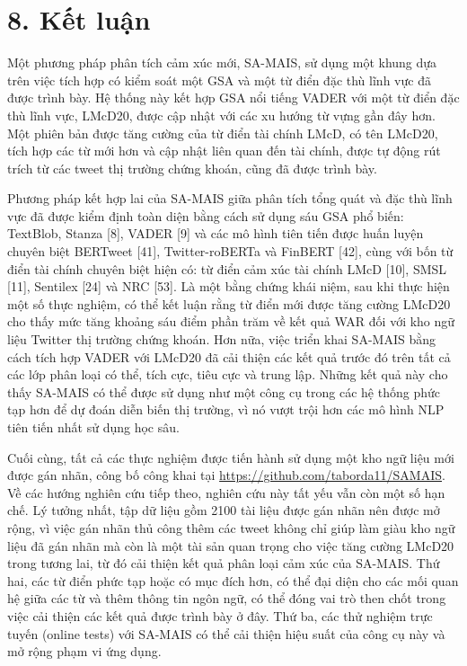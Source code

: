 \section{8. Kết luận}

Một phương pháp phân tích cảm xúc mới, SA-MAIS, sử dụng một khung dựa trên việc tích hợp có kiểm soát một GSA và một từ điển đặc thù lĩnh vực đã được trình bày. Hệ thống này kết hợp GSA nổi tiếng VADER với một từ điển đặc thù lĩnh vực, LMcD20, được cập nhật với các xu hướng từ vựng gần đây hơn. Một phiên bản được tăng cường của từ điển tài chính LMcD, có tên LMcD20, tích hợp các từ mới hơn và cập nhật liên quan đến tài chính, được tự động rút trích từ các tweet thị trường chứng khoán, cũng đã được trình bày.

Phương pháp kết hợp lai của SA-MAIS giữa phân tích tổng quát và đặc thù lĩnh vực đã được kiểm định toàn diện bằng cách sử dụng sáu GSA phổ biến: TextBlob, Stanza [8], VADER [9] và các mô hình tiên tiến được huấn luyện chuyên biệt BERTweet [41], Twitter-roBERTa và FinBERT [42], cùng với bốn từ điển tài chính chuyên biệt hiện có: từ điển cảm xúc tài chính LMcD [10], SMSL [11], Sentilex [24] và NRC [53]. Là một bằng chứng khái niệm, sau khi thực hiện một số thực nghiệm, có thể kết luận rằng từ điển mới được tăng cường LMcD20 cho thấy mức tăng khoảng sáu điểm phần trăm về kết quả WAR đối với kho ngữ liệu Twitter thị trường chứng khoán. Hơn nữa, việc triển khai SA-MAIS bằng cách tích hợp VADER với LMcD20 đã cải thiện các kết quả trước đó trên tất cả các lớp phân loại có thể, tích cực, tiêu cực và trung lập. Những kết quả này cho thấy SA-MAIS có thể được sử dụng như một công cụ trong các hệ thống phức tạp hơn để dự đoán diễn biến thị trường, vì nó vượt trội hơn các mô hình NLP tiên tiến nhất sử dụng học sâu.

Cuối cùng, tất cả các thực nghiệm được tiến hành sử dụng một kho ngữ liệu mới được gán nhãn, công bố công khai tại \url{https://github.com/taborda11/SAMAIS}. Về các hướng nghiên cứu tiếp theo, nghiên cứu này tất yếu vẫn còn một số hạn chế. Lý tưởng nhất, tập dữ liệu gồm 2100 tài liệu được gán nhãn nên được mở rộng, vì việc gán nhãn thủ công thêm các tweet không chỉ giúp làm giàu kho ngữ liệu đã gán nhãn mà còn là một tài sản quan trọng cho việc tăng cường LMcD20 trong tương lai, từ đó cải thiện kết quả phân loại cảm xúc của SA-MAIS. Thứ hai, các từ điển phức tạp hoặc có mục đích hơn, có thể đại diện cho các mối quan hệ giữa các từ và thêm thông tin ngôn ngữ, có thể đóng vai trò then chốt trong việc cải thiện các kết quả được trình bày ở đây. Thứ ba, các thử nghiệm trực tuyến (online tests) với SA-MAIS có thể cải thiện hiệu suất của công cụ này và mở rộng phạm vi ứng dụng.

